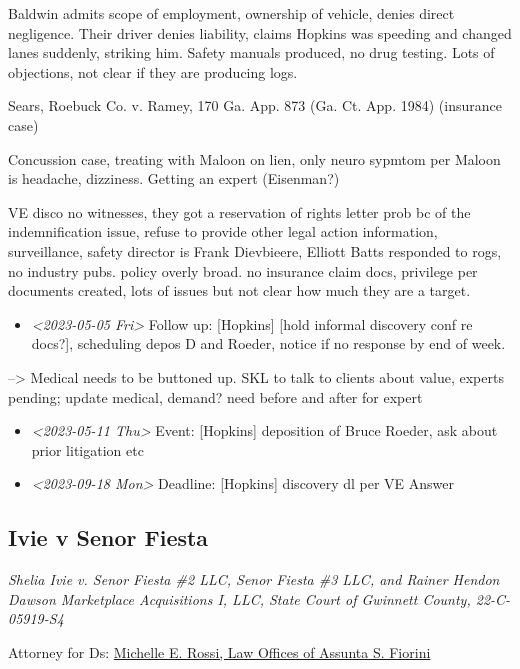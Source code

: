 \documentclass[11pt]{article}
\begin{document}
Baldwin admits scope of employment, ownership of vehicle, denies direct negligence. Their driver denies liability, claims Hopkins was speeding and changed lanes suddenly, striking him. Safety manuals produced, no drug testing. Lots of objections, not clear if they are producing logs.

Sears, Roebuck Co. v. Ramey, 170 Ga. App. 873 (Ga. Ct. App. 1984) (insurance case)

Concussion case, treating with Maloon on lien, only neuro sypmtom per Maloon is headache, dizziness. Getting an expert (Eisenman?)

VE disco no witnesses, they got a reservation of rights letter prob bc of the indemnification issue, refuse to provide other legal action information, surveillance, safety director is Frank Dievbieere, Elliott Batts responded to rogs, no industry pubs. policy overly broad. no insurance claim docs, privilege per documents created, lots of issues but not clear how much they are a target.

\begin{itemize}
\item \textit{<2023-05-05 Fri> } Follow up: [Hopkins] [hold informal discovery conf re docs?], scheduling depos D and Roeder, notice if no response by end of week.
\end{itemize}

--> Medical needs to be buttoned up. SKL to talk to clients about value, experts pending; update medical, demand? need before and after for expert

\begin{itemize}
\item \textit{<2023-05-11 Thu> } Event: [Hopkins] deposition of Bruce Roeder, ask about prior litigation etc

\item \textit{<2023-09-18 Mon> } Deadline: [Hopkins] discovery dl per VE Answer
\end{itemize}

\subsection*{Ivie v Senor Fiesta}
\label{sec:org9c75015}

\emph{Shelia Ivie v. Senor Fiesta \#2 LLC, Senor Fiesta \#3 LLC, and Rainer Hendon Dawson Marketplace Acquisitions I, LLC, State Court of Gwinnett County, 22-C-05919-S4}

Attorney for Ds: \href{https://gabar.reliaguide.com/lawyer/30319-GA-Michelle-Rossi-278195}{Michelle E. Rossi, Law Offices of Assunta S. Fiorini}
\end{document}
